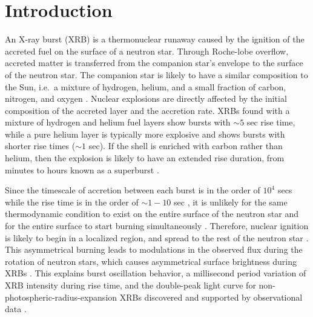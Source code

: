 \documentclass[preprint,times,tighten,linenumbers]{aastex631}
\newcommand{\MarginPar}[1]{
    \marginpar{\vskip-\baselineskip%
               \raggedright%
               \tiny\sffamily%
               {\color{red}\hrule%
               \smallskip%
               #1\par%
               \smallskip%
               \hrule}}%
}
\begin{document}

\section{Introduction}\label{Sec:Introduction}

An X-ray burst (XRB) is a thermonuclear runaway caused by the ignition of the accreted fuel on the surface of a neutron star. Through Roche-lobe overflow, accreted matter is transferred from the companion star's envelope to the surface of the neutron star. The companion star is likely to have a similar composition to the Sun, i.e.\ a mixture of hydrogen, helium, and a small fraction of carbon, nitrogen, and oxygen \citep{Galloway_2020_basics_of_xrb}. Nuclear explosions are directly affected by the initial composition of the accreted layer and the accretion rate. XRBs found with a mixture of hydrogen and helium fuel layers show bursts with $\sim 5$ sec rise time, while a pure helium layer is typically more explosive and shows bursts with shorter rise times ($\sim 1$ sec). If the shell is enriched with carbon rather than helium, then the explosion is likely to have an extended rise duration, from minutes to hours known as a superburst \citep{Kuulkers_2002,Cumming_2001,Gupta_2007}. 

Since the timescale of accretion between each burst is in the order of $10^4$ secs while the rise time is in the order of $\sim 1 - 10$ sec \citep{Parikh_2013}, it is unlikely for the same thermodynamic condition to exist on the entire surface of the neutron star and for the entire surface to start burning simultaneously \citep{Shara_1982}. Therefore, nuclear ignition is likely to begin in a localized region, and spread to the rest of the neutron star \citep{Spitkovsky_2002}. This asymmetrical burning leads to modulations in the observed flux during the rotation of neutron stars, which causes asymmetrical surface brightness during XRBs \citep{strohmayer_2009}. This explains burst oscillation behavior, a millisecond period variation of XRB intensity during rise time, and the double-peak light curve for non-photospheric-radius-expansion XRBs discovered and supported by observational data \citep{Altamirano_2010,Chakraborty_2014,Bhattacharyya_2006, Kaaret_2007,Smith_1997}.  
\end{document}
